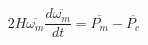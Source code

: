 \begin{equation}
2H\overline{\omega_{m}}\frac{d\overline{\omega_{m}}}{dt}=\overline{P_{m}}-\overline{P_{e}}
\label{eqmotion5}
\end{equation}
